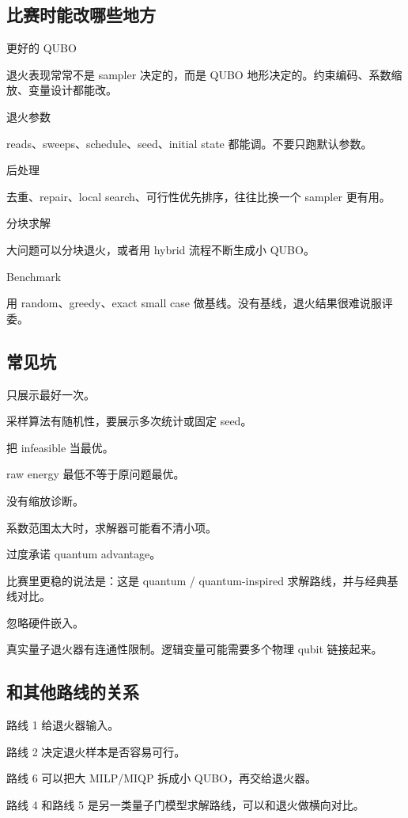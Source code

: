 \documentclass[UTF8,12pt,a4paper]{ctexart}
\begin{document}
\subsection*{比赛时能改哪些地方}

更好的 QUBO

退火表现常常不是 sampler 决定的，而是 QUBO 地形决定的。约束编码、系数缩放、变量设计都能改。

退火参数

reads、sweeps、schedule、seed、initial state 都能调。不要只跑默认参数。

后处理

去重、repair、local search、可行性优先排序，往往比换一个 sampler 更有用。

分块求解

大问题可以分块退火，或者用 hybrid 流程不断生成小 QUBO。

Benchmark

用 random、greedy、exact small case 做基线。没有基线，退火结果很难说服评委。

\subsection*{常见坑}

只展示最好一次。

采样算法有随机性，要展示多次统计或固定 seed。

把 infeasible 当最优。

raw energy 最低不等于原问题最优。

没有缩放诊断。

系数范围太大时，求解器可能看不清小项。

过度承诺 quantum advantage。

比赛里更稳的说法是：这是 quantum / quantum-inspired 求解路线，并与经典基线对比。

忽略硬件嵌入。

真实量子退火器有连通性限制。逻辑变量可能需要多个物理 qubit 链接起来。

\subsection*{和其他路线的关系}

路线 1 给退火器输入。

路线 2 决定退火样本是否容易可行。

路线 6 可以把大 MILP/MIQP 拆成小 QUBO，再交给退火器。

路线 4 和路线 5 是另一类量子门模型求解路线，可以和退火做横向对比。
\end{document}
